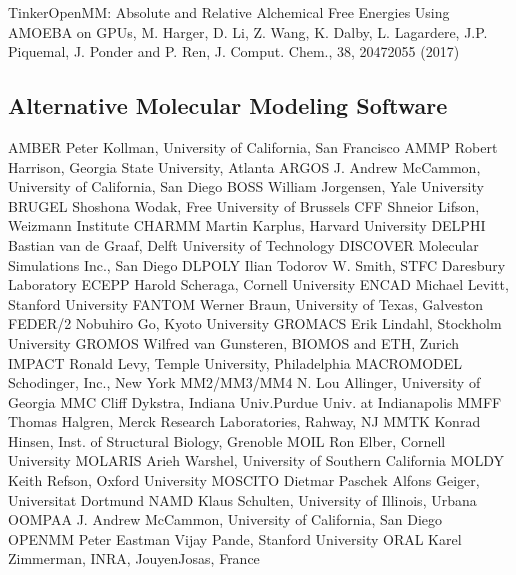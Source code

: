 \documentclass[letterpaper,11pt,english]{sphinxmanual}
\begin{document}

Tinker\sphinxhyphen{}OpenMM: Absolute and Relative Alchemical Free Energies Using AMOEBA on GPUs, M. Harger, D. Li, Z. Wang, K. Dalby, L. Lagardere, J.\sphinxhyphen{}P. Piquemal, J. Ponder and P. Ren, J. Comput. Chem., 38, 2047\sphinxhyphen{}2055 (2017)


\subsection{Alternative Molecular Modeling Software}
\label{\detokenize{text/references:alternative-molecular-modeling-software}}
\begin{sphinxVerbatim}[commandchars=\\\{\}]
AMBER          Peter Kollman, University of California, San Francisco
AMMP           Robert Harrison, Georgia State University, Atlanta
ARGOS          J. Andrew McCammon, University of California, San Diego
BOSS           William Jorgensen, Yale University
BRUGEL         Shoshona Wodak, Free University of Brussels
CFF            Shneior Lifson, Weizmann Institute
CHARMM         Martin Karplus, Harvard University
DELPHI         Bastian van de Graaf, Delft University of Technology
DISCOVER       Molecular Simulations Inc., San Diego
DL\PYGZus{}POLY        Ilian Todorov \PYGZam{} W. Smith, STFC Daresbury Laboratory
ECEPP          Harold Scheraga, Cornell University
ENCAD          Michael Levitt, Stanford University
FANTOM         Werner Braun, University of Texas, Galveston
FEDER/2        Nobuhiro Go, Kyoto University
GROMACS        Erik Lindahl, Stockholm University
GROMOS         Wilfred van Gunsteren, BIOMOS and ETH, Zurich
IMPACT         Ronald Levy, Temple University, Philadelphia
MACROMODEL     Schodinger, Inc., New York
MM2/MM3/MM4    N. Lou Allinger, University of Georgia
MMC            Cliff Dykstra, Indiana Univ.\PYGZhy{}Purdue Univ. at Indianapolis
MMFF           Thomas Halgren, Merck Research Laboratories, Rahway, NJ
MMTK           Konrad Hinsen, Inst. of Structural Biology, Grenoble
MOIL           Ron Elber, Cornell University
MOLARIS        Arieh Warshel, University of Southern California
MOLDY          Keith Refson, Oxford University
MOSCITO        Dietmar Paschek \PYGZam{} Alfons Geiger, Universitat Dortmund
NAMD           Klaus Schulten, University of Illinois, Urbana
OOMPAA         J. Andrew McCammon, University of California, San Diego
OPENMM         Peter Eastman \PYGZam{} Vijay Pande, Stanford University
ORAL           Karel Zimmerman, INRA, Jouy\PYGZhy{}en\PYGZhy{}Josas, France

\end{sphinxVerbatim}
\end{document}
